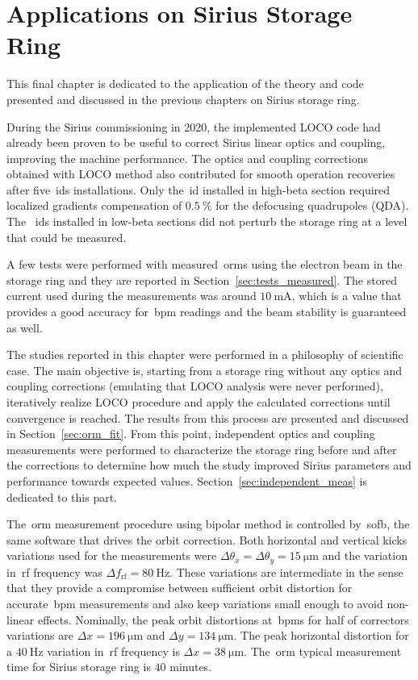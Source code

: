 \chapter{Applications on Sirius Storage Ring}

This final chapter is dedicated to the application of the theory and code presented and discussed in the previous chapters on Sirius storage ring. 

During the Sirius commissioning in 2020, the implemented LOCO code had already been proven to be useful to correct Sirius linear optics and coupling, improving the machine performance. The optics and coupling corrections obtained with LOCO method also contributed for smooth operation recoveries after five~\glspl{id} installations. Only the~\gls{id} installed in high-beta section required localized gradients compensation of $\SI{0.5}{\%}$ for the defocusing quadrupoles (QDA). The ~\glspl{id} installed in low-beta sections did not perturb the storage ring at a level that could be measured. 

A few tests were performed with measured~\glspl{orm} using the electron beam in the storage ring and they are reported in Section~\ref{sec:tests_measured}. The stored current used during the measurements was around $\SI{10}{\milli\ampere}$, which is a value that provides a good accuracy for~\gls{bpm} readings and the beam stability is guaranteed as well.

The studies reported in this chapter were performed in a philosophy of scientific case. The main objective is, starting from a storage ring without any optics and coupling corrections (emulating that LOCO analysis were never performed), iteratively realize LOCO procedure and apply the calculated corrections until convergence is reached. The results from this process are presented and discussed in Section~\ref{sec:orm_fit}. From this point, independent optics and coupling measurements were performed to characterize the storage ring before and after the corrections to determine how much the study improved Sirius parameters and performance towards expected values. Section~\ref{sec:independent_meas} is dedicated to this part.

The~\gls{orm} measurement procedure using bipolar method is controlled by~\gls{sofb}, the same software that drives the orbit correction. Both horizontal and vertical kicks variations used for the measurements were $\Delta \theta_x = \Delta \theta_y = \SI{15}{\micro\meter}$ and the variation in~\gls{rf} frequency was $\Delta f_{\mathrm{rf}} = \SI{80}{\hertz}$. These variations are intermediate in the sense that they provide a compromise between sufficient orbit distortion for accurate~\gls{bpm} measurements and also keep variations small enough to avoid non-linear effects. Nominally, the peak orbit distortions at~\glspl{bpm} for half of correctors variations are $\Delta x = \SI{196}{\micro\meter}$ and $\Delta y = \SI{134}{\micro\meter}$. The peak horizontal distortion for a $\SI{40}{\hertz}$ variation in~\gls{rf} frequency is $\Delta x = \SI{38}{\micro\meter}$. The~\gls{orm} typical measurement time for Sirius storage ring is $40$ minutes.

